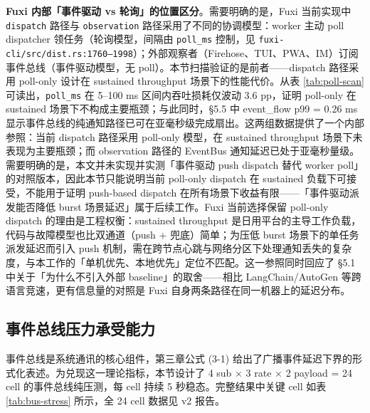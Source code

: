\textbf{Fuxi 内部「事件驱动 vs 轮询」的位置区分}。需要明确的是，Fuxi 当前实现中 \texttt{dispatch} 路径与 \texttt{observation} 路径采用了不同的协调模型：worker 主动 poll dispatcher 领任务（轮询模型，间隔由 \texttt{poll\_ms} 控制，见 \texttt{fuxi-cli/src/dist.rs:1760--1998}）；外部观察者（Firehose、TUI、PWA、IM）订阅事件总线（事件驱动模型，无 poll）。本节扫描验证的是前者——dispatch 路径采用 poll-only 设计在 sustained throughput 场景下的性能代价。从表 \ref{tab:poll-scan} 可读出，\texttt{poll\_ms} 在 5--100 ms 区间内吞吐损耗仅波动 3.6 pp，证明 poll-only 在 sustained 场景下不构成主要瓶颈；与此同时，§5.5 中 event\_flow p99 = 0.26 ms 显示事件总线的纯通知路径已可在亚毫秒级完成扇出。这两组数据提供了一个内部参照：当前 dispatch 路径采用 poll-only 模型，在 sustained throughput 场景下未表现为主要瓶颈；而 observation 路径的 EventBus 通知延迟已处于亚毫秒量级。需要明确的是，本文并未实现并实测「事件驱动 push dispatch 替代 worker poll」的对照版本，因此本节只能说明当前 poll-only dispatch 在 sustained 负载下可接受，不能用于证明 push-based dispatch 在所有场景下收益有限——「事件驱动派发能否降低 burst 场景延迟」属于后续工作。Fuxi 当前选择保留 poll-only dispatch 的理由是工程权衡：sustained throughput 是日用平台的主导工作负载，代码与故障模型也比双通道（push + 兜底）简单；为压低 burst 场景下的单任务派发延迟而引入 push 机制，需在跨节点心跳与网络分区下处理通知丢失的复杂度，与本工作的「单机优先、本地优先」定位不匹配。这一参照同时回应了 §5.1 中关于「为什么不引入外部 baseline」的取舍——相比 LangChain/AutoGen 等跨语言竞速，更有信息量的对照是 Fuxi 自身两条路径在同一机器上的延迟分布。

\subsection{事件总线压力承受能力}

事件总线是系统通讯的核心组件，第三章公式 (3-1) 给出了广播事件延迟下界的形式化表述。为兑现这一理论指标，本节设计了 4 sub × 3 rate × 2 payload = 24 cell 的事件总线纯压测，每 cell 持续 5 秒稳态。完整结果中关键 cell 如表 \ref{tab:bus-stress} 所示，全 24 cell 数据见 v2 报告。


